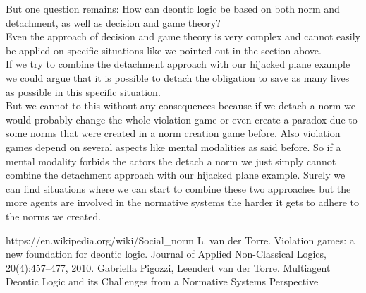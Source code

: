 \documentclass[conference]{hehe}
\begin{document}
But one question remains: How can deontic logic be based on both norm and detachment, as well as decision and game theory?\\
Even the approach of decision and game theory is very complex and cannot easily be applied on specific situations like we pointed out in the section above.\\
If we try to combine the detachment approach with our hijacked plane example we could argue that it is possible to detach the obligation to save as many lives as possible in this specific situation.\\
But we cannot to this without any consequences because if we detach a norm we would probably change the whole violation game or even create a paradox due to some norms that were created in a norm creation game before. Also violation games depend on several aspects like mental modalities as said before. So if a mental modality forbids the actors the detach a norm we just simply cannot combine the detachment approach with our hijacked plane example.
Surely we can find situations where we can start to combine these two approaches but the more agents are involved in the normative systems the harder it gets to adhere to the norms we created.
\begin{thebibliography}{00}

 https://en.wikipedia.org/wiki/Social\_norm
 L. van der Torre. Violation games: a new foundation for deontic logic. Journal of
Applied Non-Classical Logics, 20(4):457–477, 2010.
 Gabriella Pigozzi, Leendert van der Torre. Multiagent Deontic Logic
and its Challenges
from a Normative Systems Perspective
\end{thebibliography}
\vspace{12pt}
\end{document}

